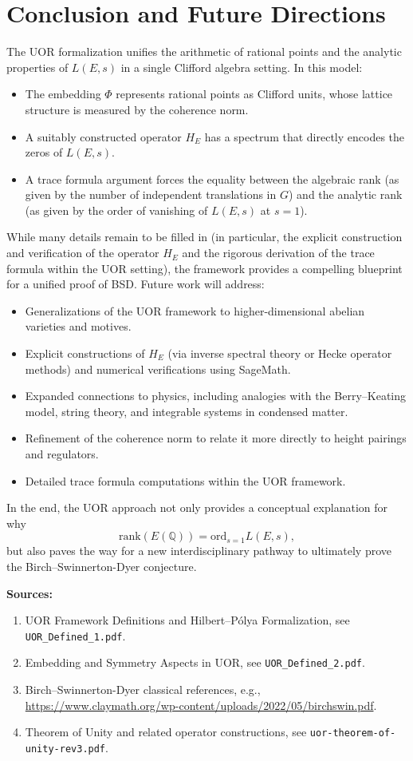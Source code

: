 \documentclass[11pt]{article}
\begin{document}
\section{Conclusion and Future Directions}

The UOR formalization unifies the arithmetic of rational points and the analytic properties of $L(E,s)$ in a single Clifford algebra setting. In this model:
\begin{itemize}
  \item The embedding $\Phi$ represents rational points as Clifford units, whose lattice structure is measured by the coherence norm.
  \item A suitably constructed operator $H_E$ has a spectrum that directly encodes the zeros of $L(E,s)$.
  \item A trace formula argument forces the equality between the algebraic rank (as given by the number of independent translations in $G$) and the analytic rank (as given by the order of vanishing of $L(E,s)$ at $s=1$).
\end{itemize}

While many details remain to be filled in (in particular, the explicit construction and verification of the operator $H_E$ and the rigorous derivation of the trace formula within the UOR setting), the framework provides a compelling blueprint for a unified proof of BSD. Future work will address:
\begin{itemize}
  \item Generalizations of the UOR framework to higher-dimensional abelian varieties and motives.
  \item Explicit constructions of $H_E$ (via inverse spectral theory or Hecke operator methods) and numerical verifications using SageMath.
  \item Expanded connections to physics, including analogies with the Berry--Keating model, string theory, and integrable systems in condensed matter.
  \item Refinement of the coherence norm to relate it more directly to height pairings and regulators.
  \item Detailed trace formula computations within the UOR framework.
\end{itemize}
In the end, the UOR approach not only provides a conceptual explanation for why 
\[
\mathrm{rank}(E(\mathbb{Q})) = \mathrm{ord}_{s=1}L(E,s),
\]
but also paves the way for a new interdisciplinary pathway to ultimately prove the Birch--Swinnerton-Dyer conjecture.

\bigskip

\noindent\textbf{Sources:}
\begin{enumerate}
  \item UOR Framework Definitions and Hilbert--Pólya Formalization, see \texttt{UOR\_Defined\_1.pdf}.
  \item Embedding and Symmetry Aspects in UOR, see \texttt{UOR\_Defined\_2.pdf}.
  \item Birch--Swinnerton-Dyer classical references, e.g., \url{https://www.claymath.org/wp-content/uploads/2022/05/birchswin.pdf}.
  \item Theorem of Unity and related operator constructions, see \texttt{uor-theorem-of-unity-rev3.pdf}.
\end{enumerate}
\end{document}
